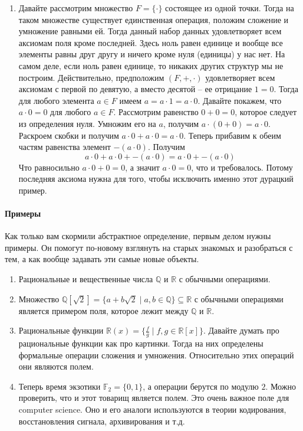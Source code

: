 \begin{enumerate}
\item Давайте рассмотрим множество $F=\{\cdot\}$ состоящее из одной точки.
Тогда на таком множестве существует единственная операция, положим сложение и умножение равными ей.
Тогда данный набор данных удовлетворяет всем аксиомам поля кроме последней.
Здесь ноль равен единице и вообще все элементы равны друг другу и ничего кроме  нуля (единицы) у нас  нет.
На самом деле, если ноль равен единице, то никаких других структур мы не построим.
Действительно, предположим $(F, +, \cdot)$ удовлетворяет всем аксиомам с первой по девятую, а вместо десятой -- ее отрицание $1 = 0$.
Тогда для любого элемента $a\in F$ имеем $a = a \cdot 1 = a \cdot 0$.
Давайте покажем, что $a \cdot 0 = 0$ для любого $a\in F$.
Рассмотрим равенство $0 + 0 = 0$, которое следует из определения нуля.
Умножим его на $a$, получим $a\cdot (0 + 0) = a \cdot 0$.
Раскроем скобки и получим $a \cdot 0 + a\cdot 0 = a\cdot 0$.
Теперь прибавим к обеим частям равенства элемент $- (a\cdot 0)$.
Получим
\[
a \cdot 0 + a\cdot 0 + - (a\cdot 0) = a\cdot 0 + - (a\cdot 0)
\]
Что равносильно $a\cdot 0 + 0 = 0$, а значит $a\cdot 0 = 0$, что и требовалось.
Потому последняя аксиома нужна для того, чтобы исключить именно этот дурацкий пример.
\end{enumerate}

\paragraph{Примеры}

Как только вам скормили абстрактное определение, первым делом нужны примеры.
Он помогут по-новому взглянуть на старых знакомых и разобраться с тем, а как вообще задавать эти самые новые объекты.

\begin{enumerate}
\item Рациональные и вещественные числа $\mathbb Q$ и $\mathbb R$ с обычными операциями.

\item Множество $\mathbb Q[\sqrt{2}] = \{a + b \sqrt{2}\mid a,b\in\mathbb Q\}\subseteq \mathbb R$ с обычными операциями является примером поля, которое лежит между $\mathbb Q$ и $\mathbb R$.

\item Рациональные функции $\mathbb R(x) = \{\frac{f}{g}\mid f,g\in\mathbb R[x]\}$.
Давайте думать про рациональные функции как про картинки.
Тогда на них определены формальные операции сложения и умножения.
Относительно этих операций они являются полем.

\item Теперь время экзотики $\mathbb F_2 =\{0, 1\}$, а операции берутся по модулю $2$.
Можно проверить, что и этот товарищ является полем.
Это очень важное поле для computer science.
Оно и его аналоги используются в теории кодирования, восстановления сигнала, архивирования и т.д.
\end{enumerate}
